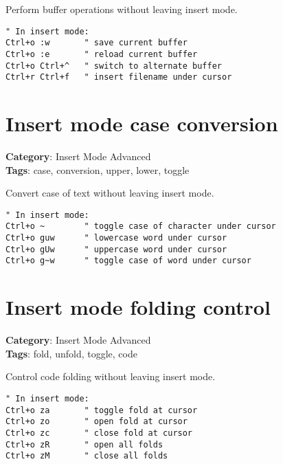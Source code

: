 {{{{{Perform buffer operations without leaving insert mode.

\begin{Exa*}{}
\begin{Verbatim}[fontsize=\footnotesize, breaklines, breakanywhere]
" In insert mode:
Ctrl+o :w       " save current buffer
Ctrl+o :e       " reload current buffer
Ctrl+o Ctrl+^   " switch to alternate buffer
Ctrl+r Ctrl+f   " insert filename under cursor
\end{Verbatim}
\end{Exa*}

\section{Insert mode case conversion}

\textbf{Category}: Insert Mode Advanced\\ \textbf{Tags}: case, conversion, upper, lower, toggle
\vspace{0.5cm}

Convert case of text without leaving insert mode.

\begin{Exa*}{}
\begin{Verbatim}[fontsize=\footnotesize, breaklines, breakanywhere]
" In insert mode:
Ctrl+o ~        " toggle case of character under cursor  
Ctrl+o guw      " lowercase word under cursor
Ctrl+o gUw      " uppercase word under cursor
Ctrl+o g~w      " toggle case of word under cursor
\end{Verbatim}
\end{Exa*}

\section{Insert mode folding control}

\textbf{Category}: Insert Mode Advanced\\ \textbf{Tags}: fold, unfold, toggle, code
\vspace{0.5cm}

Control code folding without leaving insert mode.

\begin{Exa*}{}
\begin{Verbatim}[fontsize=\footnotesize, breaklines, breakanywhere]
" In insert mode:
Ctrl+o za       " toggle fold at cursor
Ctrl+o zo       " open fold at cursor
Ctrl+o zc       " close fold at cursor
Ctrl+o zR       " open all folds
Ctrl+o zM       " close all folds
\end{Verbatim}
\end{Exa*}

}}}}}
